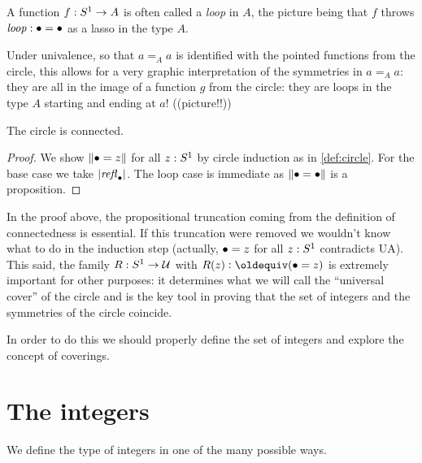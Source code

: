 \begin{remark}
A function $f:S^1\to A$ is often called a \emph{loop} in $A$, 
the picture being that $f$ throws $\mathit{loop}:\bullet=\bullet$ as a lasso in the type $A$.

  Under univalence, so that $a=_Aa$ is identified with the pointed functions 
from the circle, this allows for a very graphic interpretation of the 
symmetries in $a=_Aa$: they are all in the image of a function $g$ from 
the circle: they are loops in the type $A$ starting and ending at $a$! ((picture!!))
\end{remark}

\begin{lemma}\label{lem:circleisconnected}
  The circle is connected.
\end{lemma}
\begin{proof}
We show $\lVert\bullet=z\rVert$ for all $z:S^1$ by circle induction
as in \cref{def:circle}.
For the base case we take $\lvert\mathop{{\it refl}_{\bullet}}\rvert$.
The loop case is immediate as $\lVert\bullet=\bullet\rVert$ is a proposition.
\end{proof}

In the proof above, the propositional truncation coming 
from the definition of connectedness is essential.
If this truncation were removed we wouldn't know what to do in
the induction step (actually, ${\bullet=z}$ for all $z:S^1$ contradicts UA).
This said, the family $R:S^1\to\mathcal{U}$ with $R(z)\defequi (\base=z)$ is extremely 
important for other purposes: it determines what we will call the 
``universal cover'' of the circle and is the key tool in proving that 
the set of integers and the symmetries of the circle coincide.

In order to do this we should properly define the set of integers 
and explore the concept of coverings.

\section{The integers}
\label{sec:integers}

We define the type of integers in one of the many possible ways.

